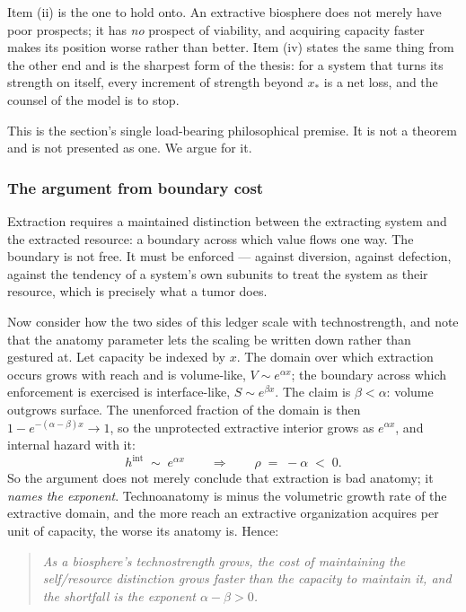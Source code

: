 \documentclass[11pt]{article}
\numberwithin{equation}{section}
\theoremstyle{plain}
\theoremstyle{definition}
\theoremstyle{remark}
\begin{document}
\noindent Item (ii) is the one to hold onto. An extractive biosphere
does not merely have poor prospects; it has \emph{no} prospect of
viability, and acquiring capacity faster makes its position worse rather
than better. Item (iv) states the same thing from the other end and is
the sharpest form of the thesis: for a system that turns its strength on
itself, every increment of strength beyond $x_\ast$ is a net loss, and
the counsel of the model is to stop.

This is the section's single load-bearing philosophical premise. It is
not a theorem and is not presented as one. We argue for it.

\subsubsection{The argument from boundary cost}\label{gr:subsub:boundary}

Extraction requires a maintained distinction between the extracting
system and the extracted resource: a boundary across which value flows
one way. The boundary is not free. It must be enforced --- against
diversion, against defection, against the tendency of a system's own
subunits to treat the system as their resource, which is precisely what
a tumor does.

Now consider how the two sides of this ledger scale with technostrength,
and note that the anatomy parameter lets the scaling be written down
rather than gestured at. Let capacity be indexed by $x$. The domain over
which extraction occurs grows with reach and is volume-like,
$V\sim e^{\alpha x}$; the boundary across which enforcement is exercised
is interface-like, $S\sim e^{\beta x}$. The claim is
$\beta<\alpha$: volume outgrows surface. The unenforced fraction of the
domain is then $1-e^{-(\alpha-\beta)x}\to1$, so the unprotected
extractive interior grows as $e^{\alpha x}$, and internal hazard with
it:
\begin{equation}\label{gr:eq:rhoextract}
h^{\mathrm{int}}\;\sim\;e^{\alpha x}
\qquad\Longrightarrow\qquad
\rho\;=\;-\alpha\;<\;0 .
\end{equation}
So the argument does not merely conclude that extraction is bad
anatomy; it \emph{names the exponent}. Technoanatomy is minus the
volumetric growth rate of the extractive domain, and the more reach an
extractive organization acquires per unit of capacity, the worse its
anatomy is. Hence:

\begin{quote}
\emph{As a biosphere's technostrength grows, the cost of maintaining the
self/resource distinction grows faster than the capacity to maintain
it, and the shortfall is the exponent $\alpha-\beta>0$.}
\end{quote}
\end{document}
